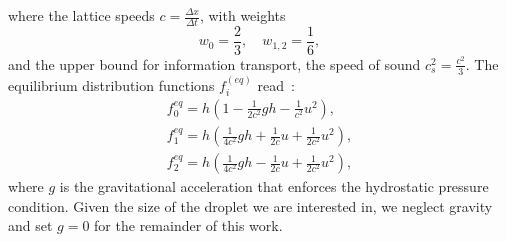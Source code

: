 \documentclass[twocolumn,amsmath,amssymb,showpacs,pre,nofootinbib,superscriptaddress]{revtex4-1} %
\begin{document}
where the lattice speeds $c=\frac{\Delta x}{\Delta t}$, with weights
\begin{equation}
w_0 = \frac{2}{3},\quad w_{1,2} = \frac{1}{6},
\end{equation}
and the upper bound for information transport, the speed of sound $c_s^2=\frac{c^2}{3}$.
The equilibrium distribution functions $f_i^{(eq)}$ read~\cite{VANTHANG20107373}:
\begin{gather}
    f_{0}^{eq} = h\left(1-\frac{1}{2c^2}gh - \frac{1}{c^2}u^2\right),\nonumber\\
    f_{1}^{eq} = h\left(\frac{1}{4c^2}gh + \frac{1}{2c}u + \frac{1}{2c^2}u^2\right)\label{eq:equilibria},\\
    f_{2}^{eq} = h\left(\frac{1}{4c^2}gh - \frac{1}{2c}u + \frac{1}{2c^2}u^2\right),\nonumber
\end{gather}
where $g$ is the gravitational acceleration that enforces the hydrostatic pressure condition. 
Given the size of the droplet we are interested in, we neglect gravity and set $g=0$ for the remainder of this work.
\end{document}
